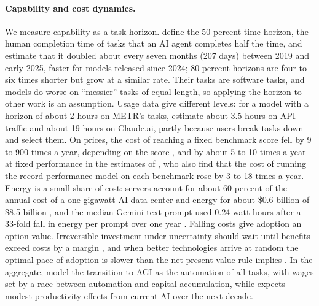 \paragraph{Capability and cost dynamics.} We measure capability as a task horizon. \citet{kwa2025measuring} define the 50 percent time horizon, the human completion time of tasks that an AI agent completes half the time, and estimate that it doubled about every seven months (207 days) between 2019 and early 2025, faster for models released since 2024; 80 percent horizons are four to six times shorter but grow at a similar rate. Their tasks are software tasks, and models do worse on ``messier'' tasks of equal length, so applying the horizon to other work is an assumption. Usage data give different levels: for a model with a horizon of about 2 hours on METR's tasks, \citet{appel2026anthropic} estimate about 3.5 hours on API traffic and about 19 hours on Claude.ai, partly because users break tasks down and select them. On prices, the cost of reaching a fixed benchmark score fell by 9 to 900 times a year, depending on the score \citep{epoch2025inference}, and by about 5 to 10 times a year at fixed performance in the estimates of \citet{gundlach2025price}, who also find that the cost of running the record-performance model on each benchmark rose by 3 to 18 times a year. Energy is a small share of cost: servers account for about 60 percent of the annual cost of a one-gigawatt AI data center and energy for about \$0.6 billion of \$8.5 billion \citep{michael2026servers}, and the median Gemini text prompt used 0.24 watt-hours after a 33-fold fall in energy per prompt over one year \citep{elsworth2025measuring}. Falling costs give adoption an option value. Irreversible investment under uncertainty should wait until benefits exceed costs by a margin \citep{mcdonald1986value,dixit1994investment}, and when better technologies arrive at random the optimal pace of adoption is slower than the net present value rule implies \citep{farzin1998optimal}. In the aggregate, \citet{korinek2024scenarios} model the transition to AGI as the automation of all tasks, with wages set by a race between automation and capital accumulation, while \citet{acemoglu2025simple} expects modest productivity effects from current AI over the next decade.

